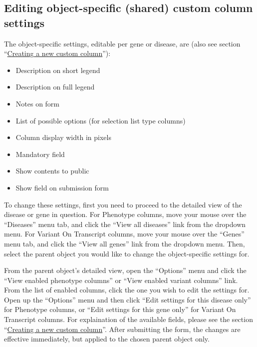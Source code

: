 \documentclass[a4paper,oneside,openany,12pt]{memoir}
\renewenvironment{leftbar}[1][\hsize]
{%
    \def\FrameCommand
    {%
        {\color{LOVDdark}\vrule width 3pt \hspace{5pt}}%
        \colorbox{LOVDlight}%
    }%
    \MakeFramed{\hsize#1\advance\hsize-\width\FrameRestore}%
}
{\endMakeFramed}
\begin{document}
\subsection{Editing object-specific (shared) custom column settings}
The object-specific settings, editable per gene or disease, are (also see section ``\hyperlink{sec:custom_column_create}{Creating a new custom column}''):
\tightlists
\begin{itemize}
  \item Description on short legend
  \item Description on full legend
  \item Notes on form
  \item List of possible options (for selection list type columns)
  \item Column display width in pixels
  \item Mandatory field
  \item Show contents to public
  \item Show field on submission form
\end{itemize}
\vspace{\baselineskip}
To change these settings, first you need to proceed to the detailed view of the disease or gene in question.
For Phenotype columns, move your mouse over the ``Diseases'' menu tab, and click the ``View all diseases'' link from the dropdown menu.
For Variant On Transcript columns, move your mouse over the ``Genes'' menu tab, and click the ``View all genes'' link from the dropdown menu.
Then, select the parent object you would like to change the object-specific settings for.

From the parent object's detailed view, open the ``Options'' menu and click the ``View enabled phenotype columns'' or ``View enabled variant columns'' link.
From the list of enabled columns, click the one you wish to edit the settings for.
Open up the ``Options'' menu and then click ``Edit settings for this disease only'' for Phenotype columns, or ``Edit settings for this gene only'' for Variant On Transcript columns.
For explaination of the available fields, please see the section ``\hyperlink{sec:custom_column_create}{Creating a new custom column}''.
After submitting the form, the changes are effective immediately, but applied to the chosen parent object only.
\end{document}
